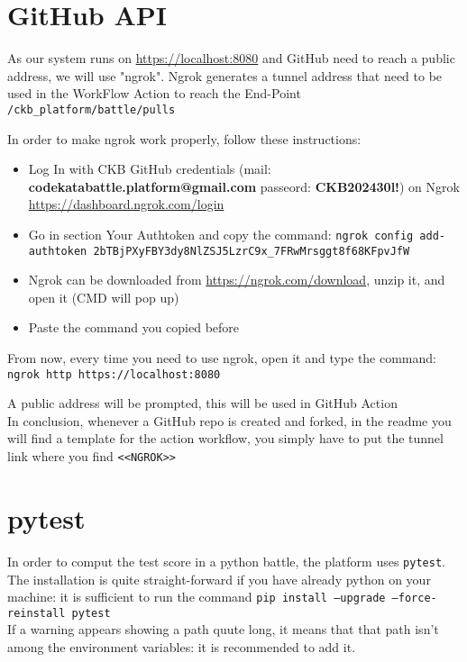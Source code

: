 \section{GitHub API}

As our system runs on  \url{https://localhost:8080} and GitHub need to reach a public address, we will use "ngrok". Ngrok generates a tunnel address that need to be used in the WorkFlow Action to reach the End-Point \texttt{/ckb{\_}platform/battle/pulls}

In order to make ngrok work properly, follow these instructions:
\begin{itemize}
    \item Log In with CKB GitHub credentials (mail: \textbf{codekatabattle.platform@gmail.com} passeord: \textbf{CKB202430l!}) on Ngrok \url{https://dashboard.ngrok.com/login}
    \item Go in section Your Authtoken and copy the command: \texttt{ngrok config add-authtoken 2bTBjPXyFBY3dy8NlZSJ5LzrC9x{\_}7FRwMrsggt8f68KFpvJfW}
    \item Ngrok can be downloaded from \url{https://ngrok.com/download}, unzip it, and open it (CMD will pop up)
    \item Paste the command you copied before
\end{itemize}
From now, every time you need to use ngrok, open it and type the command: \texttt{ngrok http https://localhost:8080}

A public address will be prompted, this will be used in GitHub Action\\

In conclusion, whenever a GitHub repo is created and forked, in the readme you will find a template for the action workflow, you simply have to put the tunnel link where you find \texttt{<<NGROK>>}

\section{pytest}

In order to comput the test score in a python battle, the platform uses \texttt{pytest}.\\

The installation is quite straight-forward if you have already python on your machine: it is sufficient to run the command \texttt{pip install --upgrade --force-reinstall pytest}\\
If a warning appears showing a path quute long, it means that that path isn't among the environment variables: it is recommended to add it.

